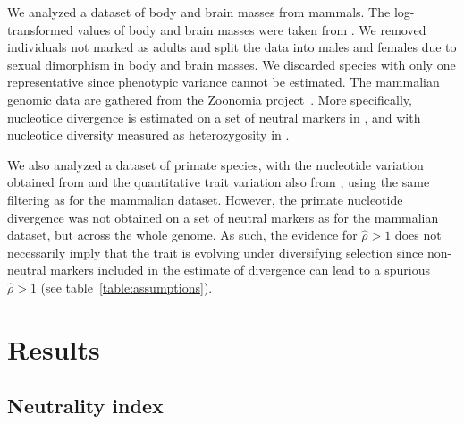 \documentclass{article}
\newcommand{\EstNI}{\widehat{\rho}}
\begin{document}
We analyzed a dataset of body and brain masses from mammals.
The log-transformed values of body and brain masses were taken from \citet{tsuboi_breakdown_2018}.
We removed individuals not marked as adults and split the data into males and females due to sexual dimorphism in body and brain masses.
We discarded species with only one representative since phenotypic variance cannot be estimated.
The mammalian genomic data are gathered from the Zoonomia project~\citep{genereux_comparative_2020}.
More specifically, nucleotide divergence is estimated on a set of neutral markers in \citet{foley_genomic_2023}, and with nucleotide diversity measured as heterozygosity in \citet{wilder_contribution_2023}.

We also analyzed a dataset of primate species, with the nucleotide variation obtained from \citet{kuderna_global_2023} and the quantitative trait variation also from \citet{tsuboi_breakdown_2018}, using the same filtering as for the mammalian dataset.
However, the primate nucleotide divergence was not obtained on a set of neutral markers as for the mammalian dataset, but across the whole genome.
As such, the evidence for $\EstNI > 1$ does not necessarily imply that the trait is evolving under diversifying selection since non-neutral markers included in the estimate of divergence can lead to a spurious $\EstNI > 1$ (see table~\ref{table:assumptions}).

\section*{Results}\label{sec:results}

\subsection*{Neutrality index}
\end{document}

